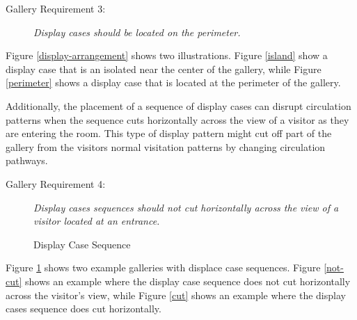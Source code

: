 \documentclass[12pt]{ucthesis}
\begin{document}
\begin{description}
\item[Gallery Requirement 3:] \emph{Display cases should be located on the perimeter.}
\end{description} 

Figure \ref{display-arrangement} shows two illustrations. Figure \ref{island} show a display case that is an isolated  near the center of the gallery, while Figure \ref{perimeter} shows a display case that is located at the perimeter of the gallery. 

Additionally, the placement of a sequence of display cases can disrupt circulation patterns when the sequence cuts horizontally across the view of a visitor as they are entering the room. This type of display pattern might cut off part of the gallery from the visitors normal visitation patterns by changing circulation pathways.

\begin{description}
\item[Gallery Requirement 4:] \emph{Display cases sequences should not cut horizontally across the view of a visitor located at an entrance.}
\end{description} 

\begin{figure}[H]\label{cut-horizontal}
\centering
{}
\hspace{10 mm}
\caption{Display Case Sequence}
\end{figure}

Figure \ref{cut-horizontal} shows two example galleries with displace case sequences. Figure \ref{not-cut} shows an example where the display case sequence does not cut horizontally across the visitor's view, while Figure \ref{cut} shows an example where the display cases sequence does cut horizontally.
\end{document}

